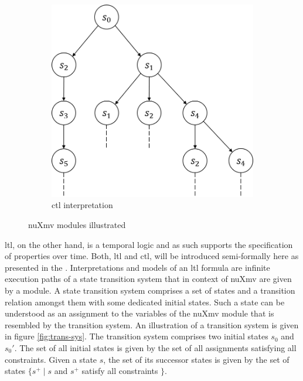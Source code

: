 \begin{figure}
    \begin{center}
        \begin{subfigure}[b]{\subfigw}
            \centering
            \includegraphics[scale=\figscale]{figures/ctl-interpretation.png}
            \caption{\gls{ctl} interpretation}
            \label{fig:ctl-int}
        \end{subfigure}
    \end{center}
    \caption{nuXmv modules illustrated}
\end{figure}

\gls{ltl}, on the other hand, is a temporal logic and as such supports the specification of properties over time.
Both, \gls{ltl} and \gls{ctl}, will be introduced semi-formally here as presented in the  \cite{nuXmv}.
Interpretations and models of an \gls{ltl} formula are infinite execution paths of a state transition system that in context of nuXmv are given by a module.
A state transition system comprises a set of states and a transition relation amongst them with some dedicated initial states.
Such a state can be understood as an assignment to the variables of the nuXmv module that is resembled by the transition system.
An illustration of a transition system is given in figure \ref{fig:trans-sys}.
The transition system comprises two initial states $ s_0 $ and $ s_0' $.
The set of all initial states is given by the set of all assignments satisfying all  constraints.
Given a state $ s $, the set of its successor states is given by the set of states $ \{ s^+ \mid s $ and $ s^+ $ satisfy all  constraints $ \} $.

